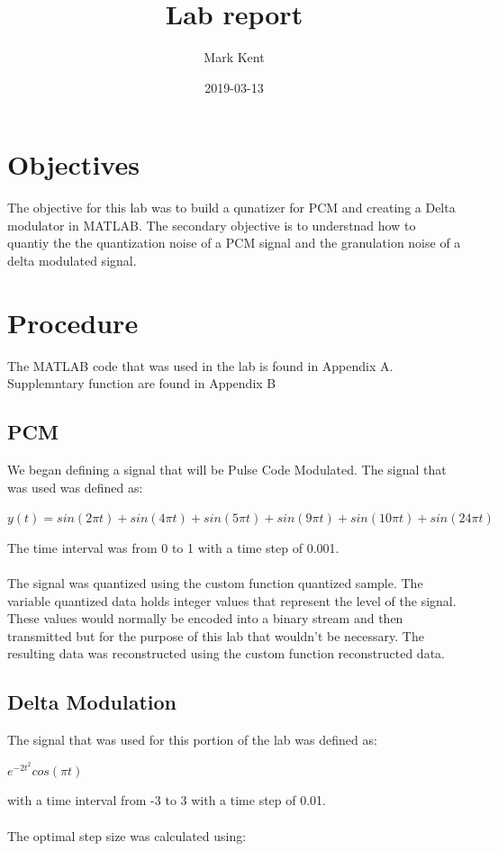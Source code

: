 \documentclass{article}
\title{Lab report}
\date{2019-03-13}
\author{Mark Kent}
\begin{document}
\section{Objectives}

\indent
The objective for this lab was to build a qunatizer for PCM and creating a Delta
modulator in MATLAB. The secondary objective is to understnad how to quantiy the
the quantization noise of a PCM signal and the granulation noise of a delta
modulated signal.


\section{Procedure}
The MATLAB code that was used in the lab is found in Appendix A. Supplemntary function are found in Appendix B
\subsection{PCM}

We began defining a signal that will be Pulse Code Modulated.
The signal that was used was defined as:

\begin{center}
$
y(t) = sin(2 \pi t) + sin(4 \pi t) +sin(5 \pi t) +sin(9 \pi t) +sin(10 \pi t) +sin(24 \pi t)
$
\end{center}

\noindent
The time interval was from 0 to 1 with a time step of 0.001.\\ \\
\noindent
The signal was quantized using the custom function quantized sample.
The variable quantized data holds integer values that represent the level of the signal.
These values would normally be encoded into a binary stream and then transmitted but
for the purpose of this lab that wouldn't be necessary.
\noindent
The resulting data was reconstructed using the custom function reconstructed data.

\subsection{Delta Modulation}

The signal that was used for this portion of the lab was defined as:\\
\begin{center}
\large
$
e^{-2 t^2}cos(\pi t)
$
\normalsize
\end{center}
\noindent
with a time interval from -3 to 3 with a time step of 0.01.\\ \\
\noindent
The optimal step size was calculated using:
\end{document}
